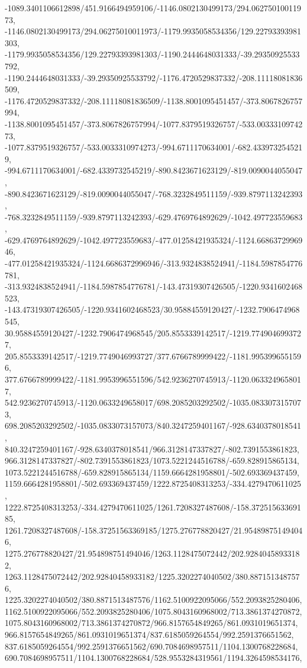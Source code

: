 {    -1089.3401106612898/451.9166494959106/-1146.0802130499173/294.06275010011973,
    -1146.0802130499173/294.06275010011973/-1179.9935058534356/129.22793393981303,
    -1179.9935058534356/129.22793393981303/-1190.2444648031333/-39.29350925533792,
    -1190.2444648031333/-39.29350925533792/-1176.4720529837332/-208.11118081836509,
    -1176.4720529837332/-208.11118081836509/-1138.8001095451457/-373.8067826757994,
    -1138.8001095451457/-373.8067826757994/-1077.8379519326757/-533.0033310974273,
    -1077.8379519326757/-533.0033310974273/-994.6711170634001/-682.4339732545219,
    -994.6711170634001/-682.4339732545219/-890.8423671623129/-819.0090044055047,
    -890.8423671623129/-819.0090044055047/-768.3232849511159/-939.8797113242393,
    -768.3232849511159/-939.8797113242393/-629.4769764892629/-1042.497723559683,
    -629.4769764892629/-1042.497723559683/-477.01258421935324/-1124.6686372996946,
    -477.01258421935324/-1124.6686372996946/-313.9324838524941/-1184.5987854776781,
    -313.9324838524941/-1184.5987854776781/-143.47319307426505/-1220.9341602468523,
    -143.47319307426505/-1220.9341602468523/30.95884559120427/-1232.7906474968545,
    30.95884559120427/-1232.7906474968545/205.8553339142517/-1219.7749046993727,
    205.8553339142517/-1219.7749046993727/377.6766789999422/-1181.9953996551596,
    377.6766789999422/-1181.9953996551596/542.9236270745913/-1120.0633249658017,
    542.9236270745913/-1120.0633249658017/698.2085203292502/-1035.0833073157073,
    698.2085203292502/-1035.0833073157073/840.3247259401167/-928.6340378018541,
    840.3247259401167/-928.6340378018541/966.3128147337827/-802.7391553861823,
    966.3128147337827/-802.7391553861823/1073.5221244516788/-659.828915865134,
    1073.5221244516788/-659.828915865134/1159.6664281958801/-502.693369437459,
    1159.6664281958801/-502.693369437459/1222.8725408313253/-334.4279470611025,
    1222.8725408313253/-334.4279470611025/1261.7208327487608/-158.37251563369185,
    1261.7208327487608/-158.37251563369185/1275.276778820427/21.954898751494046,
    1275.276778820427/21.954898751494046/1263.1128475072442/202.92840458933182,
    1263.1128475072442/202.92840458933182/1225.3202274040502/380.8871513487576,
    1225.3202274040502/380.8871513487576/1162.5100922095066/552.2093825280406,
    1162.5100922095066/552.2093825280406/1075.8043160968002/713.3861374270872,
    1075.8043160968002/713.3861374270872/966.8157654849265/861.0931019651374,
    966.8157654849265/861.0931019651374/837.6185059264554/992.2591376651562,
    837.6185059264554/992.2591376651562/690.7084698957511/1104.1300768228684,
    690.7084698957511/1104.1300768228684/528.9553284319561/1194.3264598534176,
}
